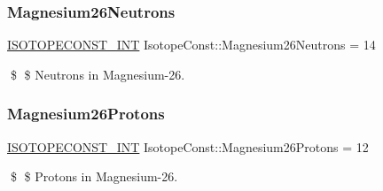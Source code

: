 \subsubsection{\texorpdfstring{Magnesium26\+Neutrons}{Magnesium26Neutrons}}
{\footnotesize\ttfamily \mbox{\hyperlink{group___isotope_const-_macros_ga5f18360b3e99483a35c32d789e62621c}{I\+S\+O\+T\+O\+P\+E\+C\+O\+N\+S\+T\+\_\+\+I\+NT}} Isotope\+Const\+::\+Magnesium26\+Neutrons = 14}

\$ \$ Neutrons in Magnesium-\/26. \mbox{\label{group___isotope_const-_magnesium-_mg26_ga07b6c7dda14bfa336002253f4b91d8c2}} 
\subsubsection{\texorpdfstring{Magnesium26\+Protons}{Magnesium26Protons}}
{\footnotesize\ttfamily \mbox{\hyperlink{group___isotope_const-_macros_ga5f18360b3e99483a35c32d789e62621c}{I\+S\+O\+T\+O\+P\+E\+C\+O\+N\+S\+T\+\_\+\+I\+NT}} Isotope\+Const\+::\+Magnesium26\+Protons = 12}

\$ \$ Protons in Magnesium-\/26. 